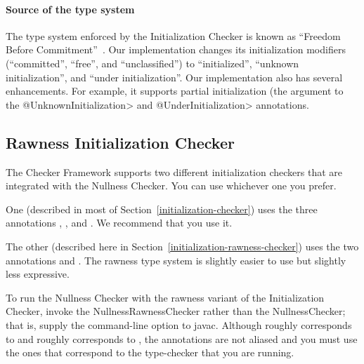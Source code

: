 \paragraph{Source of the type system\label{initialization-checking-type-system}}

The type system enforced by the Initialization Checker is known as
``Freedom Before Commitment''~\cite{SummersM2011}.  Our implementation
changes its initialization modifiers (``committed'', ``free'', and
``unclassified'') to ``initialized'', ``unknown initialization'', and
``under initialization''.  Our implementation also has several
enhancements.  For example, it supports partial initialization (the
argument to the \<@UnknownInitialization> and \<@UnderInitialization>
annotations.



\subsection{Rawness Initialization Checker\label{initialization-rawness-checker}}

The Checker Framework supports two different initialization checkers that
are integrated with the Nullness Checker.
You can use whichever one you prefer.

One (described in most of Section~\ref{initialization-checker}) uses the three annotations
,
, and
.
We recommend that you use it.

The other (described here in Section~\ref{initialization-rawness-checker})
uses the two annotations
 and
.
The rawness type system is slightly easier to use but slightly less
expressive.

\begin{sloppypar}
To run the Nullness Checker with the rawness variant of the Initialization
Checker, invoke the NullnessRawnessChecker rather than the NullnessChecker;
that is, supply the 
command-line option to javac.
Although  roughly corresponds to 
and  roughly corresponds to , the
annotations are not aliased and you must use the ones that correspond to
the type-checker that you are running.
\end{sloppypar}


